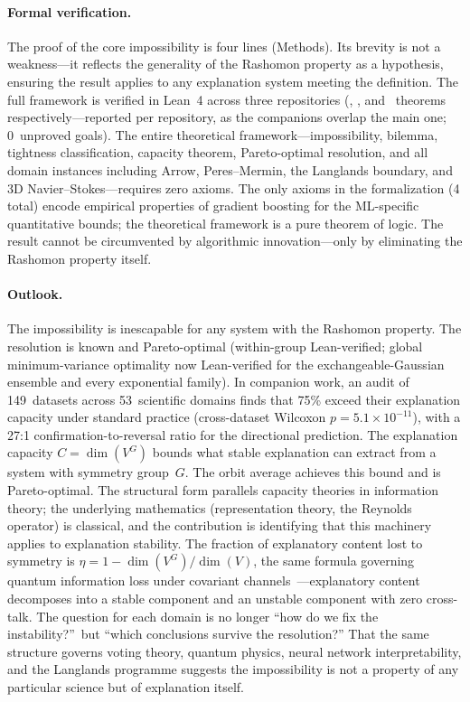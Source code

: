 \documentclass[11pt]{article}
\begin{document}
\paragraph{Formal verification.}
The proof of the core impossibility is four lines (Methods).  Its
brevity is not a weakness---it reflects the generality of the Rashomon
property as a hypothesis, ensuring the result applies to any
explanation system meeting the definition.  The full framework is
verified in Lean~4 across three repositories (\ClaimMainTheorems, \ClaimDashTheorems, and
\ClaimOstrowskiTheorems~theorems respectively---reported per repository, as the companions
overlap the main one; 0~unproved goals).  The entire theoretical
framework---impossibility, bilemma, tightness classification, capacity
theorem, Pareto-optimal resolution, and all domain instances including
Arrow, Peres--Mermin, the Langlands boundary, and 3D
Navier--Stokes---requires zero axioms.  The only axioms in the
formalization (4 total) encode empirical properties of gradient
boosting for the ML-specific quantitative bounds; the theoretical
framework is a pure theorem of logic.  The result cannot be
circumvented by algorithmic innovation---only by eliminating the
Rashomon property itself.

\paragraph{Outlook.}
The impossibility is inescapable for any system with the Rashomon
property.  The resolution is known and Pareto-optimal (within-group Lean-verified; global minimum-variance optimality now Lean-verified for the exchangeable-Gaussian ensemble and every exponential family).  In companion work, an audit of
149~datasets across 53~scientific domains finds that 75\% exceed their
explanation capacity under standard practice (cross-dataset Wilcoxon
$p = 5.1 \times 10^{-11}$), with a 27:1
confirmation-to-reversal ratio for the directional
prediction.  The explanation capacity
$C = \dim(V^G)$ bounds what stable explanation can extract from a
system with symmetry group~$G$.  The orbit average achieves this bound
and is Pareto-optimal.  The structural form parallels capacity
theories in information theory; the underlying mathematics
(representation theory, the Reynolds operator) is classical, and the
contribution is identifying that this machinery applies to explanation
stability.  The fraction of explanatory content lost to
symmetry is $\eta = 1 - \dim(V^G)/\dim(V)$, the same formula governing
quantum information loss under covariant
channels~\citep{bartlett2007reference}---explanatory content decomposes
into a stable component and an unstable component with zero cross-talk.
The question for each domain is no longer ``how do we fix the
instability?''\ but ``which conclusions survive the resolution?''  That the same
structure governs voting theory, quantum physics, neural network
interpretability, and the Langlands programme suggests the impossibility
is not a property of any particular science but of explanation itself.
\end{document}
